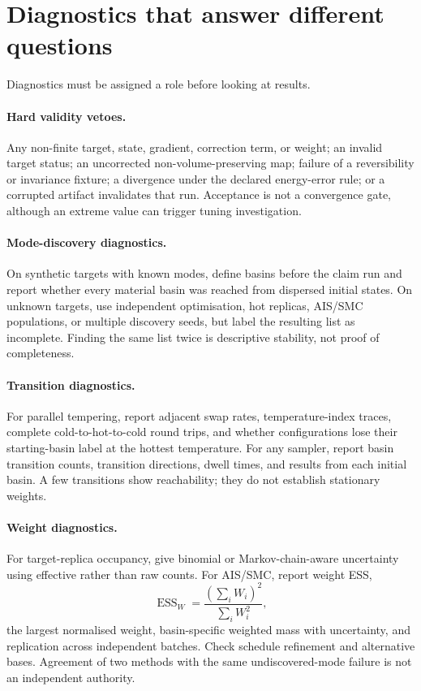 \documentclass[11pt]{article}
\newcommand{\ESS}{\operatorname{ESS}}
\begin{document}
\section{Diagnostics that answer different questions}

Diagnostics must be assigned a role before looking at results.

\paragraph{Hard validity vetoes.}
Any non-finite target, state, gradient, correction term, or weight; an invalid target
status; an uncorrected non-volume-preserving map; failure of a reversibility or
invariance fixture; a divergence under the declared energy-error rule; or a corrupted
artifact invalidates that run.  Acceptance is not a convergence gate, although an
extreme value can trigger tuning investigation.

\paragraph{Mode-discovery diagnostics.}
On synthetic targets with known modes, define basins before the claim run and report
whether every material basin was reached from dispersed initial states.  On unknown
targets, use independent optimisation, hot replicas, AIS/SMC populations, or multiple
discovery seeds, but label the resulting list as incomplete.  Finding the same list
twice is descriptive stability, not proof of completeness.

\paragraph{Transition diagnostics.}
For parallel tempering, report adjacent swap rates, temperature-index traces,
complete cold-to-hot-to-cold round trips, and whether configurations lose their
starting-basin label at the hottest temperature.  For any sampler, report basin
transition counts, transition directions, dwell times, and results from each
initial basin.  A few transitions show reachability; they do not establish stationary
weights.

\paragraph{Weight diagnostics.}
For target-replica occupancy, give binomial or Markov-chain-aware uncertainty using
effective rather than raw counts.  For AIS/SMC, report weight ESS,
\begin{equation}
  \ESS_W=\frac{(\sum_i W_i)^2}{\sum_i W_i^2},
\end{equation}
the largest normalised weight, basin-specific weighted mass with uncertainty, and
replication across independent batches.  Check schedule refinement and alternative
bases.  Agreement of two methods with the same undiscovered-mode failure is not an
independent authority.
\end{document}
